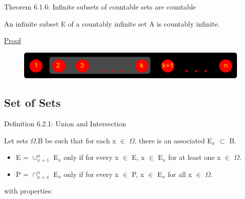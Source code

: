 { \color{red} Theorem 6.1.6: Infinite subsets of countable sets are countable } 

	\qquad An infinite subset E of a countably infinite set A is countably infinite.

{ \color{magenta} \underline{Proof} }


\begin{figure}[h]
	\centering
	\includegraphics[scale=0.5]{Images/6.1.6.png}
\end{figure}





\subsection{ Set of Sets } 

{ \color{blue} Definition 6.2.1: Union and Intersection } 

	\begin{adjustbox}{minipage=14cm, right, vspace=0.1cm 0cm}
		Let sets $\Omega$,B be such that for each x $\in$ $\Omega$,
		there is an associated E$_x$ $\subset$ B.
		\begin{itemize}[leftmargin=1cm, itemsep=0.1cm]
			\item E = $\cup_{x=1}^{n}$ E$_x$ only if for every x $\in$ E,
			x $\in$ E$_x$ for at least one x $\in$ $\Omega$.

			\item P = $\cap_{x=1}^{n}$ E$_x$ only if for every x $\in$ P,
			x $\in$ E$_x$ for all x $\in$ $\Omega$.
		\end{itemize}
		with properties:
	\end{adjustbox}

